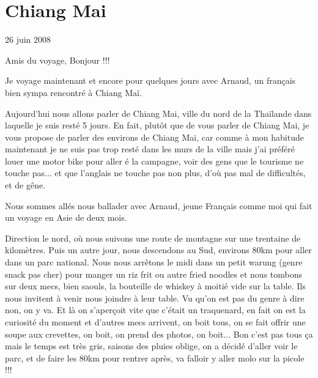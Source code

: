 \section{Chiang Mai}

26 juin 2008

\begin{multicols}{2}

Amis du voyage, Bonjour !!!

Je voyage maintenant et encore pour quelques jours avec Arnaud, un français bien sympa rencontré à Chiang Maï.

Aujourd'hui nous allons parler de Chiang Mai, ville du nord de la Thaïlande dans laquelle je suis resté 5 jours. En fait, plutôt que de vous parler de Chiang Mai, je vous propose de parler des environs de Chiang Mai, car comme à mon habitude maintenant je ne suis pas trop resté dans les murs de la ville mais j'ai préféré louer une motor bike pour aller é la campagne, voir des gens que le tourisme ne touche pas... et que l'anglais ne touche pas non plus, d'où pas mal de difficultés, et de gêne.

Nous sommes allés nous ballader avec Arnaud, jeune Français comme moi qui fait un voyage en Asie de deux mois.

Direction le nord, où nous suivons une route de montagne sur une trentaine de kilomètres. Puis un autre jour, nous descendons au Sud, environs 80km pour aller dans un parc national. Nous nous arrêtons le midi dans un petit warung (genre snack pas cher) pour manger un riz frit ou autre fried noodles et nous tombons sur deux mecs, bien saouls, la bouteille de whiskey à moitié vide sur la table. Ils nous invitent à venir nous joindre à leur table. Vu qu'on est pas du genre à dire non, on y va. Et là on s'aperçoit vite que c'était un traquenard, en fait on est la curiosité du moment et d'autres mecs arrivent, on boit tous, on se fait offrir une soupe aux crevettes, on boit, on prend des photos, on boit... Bon c'est pas tous ça mais le temps est très gris, saisons des pluies oblige, on a décidé d'aller voir le parc, et de faire les 80km pour rentrer après, va falloir y aller molo sur la picole !!!




\end{multicols}
